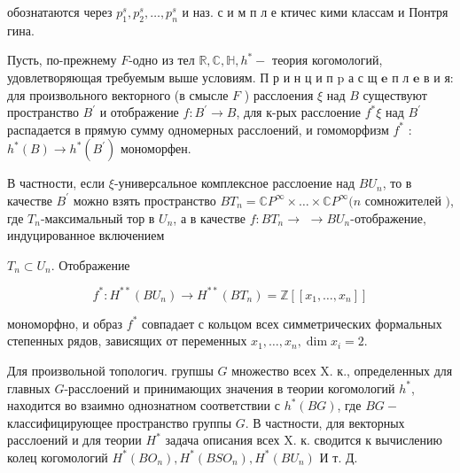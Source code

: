 \documentclass[10pt]{article}
\begin{document}
обознатаются через $p_{1}^{s}, p_{2}^{s}, \ldots, p_{n}^{s}$ и наз. с и м п л е ктичес кими классам и Понтря гина.



Пусть, по-прежнему $F$-одно из тел $\mathbb{R}, \mathbb{C}, \mathbb{H}, h^{*}-$ теория когомологий, удовлетворяющая требуемым выше условиям. П р и н ц и п $\mathrm{p}$ а с щ $\mathbf{e}$ п л $\mathbf{e}$ в и я: для произвольного векторного (в смысле $F$ ) расслоения $\xi$ над $B$ существуют пространство $B^{\prime}$ и отображение $f: B^{\prime} \longrightarrow B$, для к-рых расслоение $f^{*} \xi$ над $B^{\prime}$ распадается в прямую сумму одномерных расслоений, и гомоморфизм $f^{*}$ : $h^{*}(B) \longrightarrow h^{*}\left(B^{\prime}\right)$ мономорфен.



В частности, если $\xi$-универсальное комплексное расслоение над $B U_{n}$, то в качестве $B^{\prime}$ можно взять пространство $B T_{n}=\mathbb{C} P^{\infty} \times \ldots \times \mathbb{C} P^{\infty}(n$ сомножителей $)$, где $T_{n}$-максимальный тор в $U_{n}$, а в качестве $f: B T_{n} \longrightarrow$ $\longrightarrow B U_{n}$-отображение, индуцированное включением

$T_{n} \subset U_{n}$. Отображение



\[

f^{*}: H^{* *}\left(B U_{n}\right) \longrightarrow H^{* *}\left(B T_{n}\right)=\mathbb{Z}\left[\left[x_{1}, \ldots, x_{n}\right]\right]

\]



мономорфно, и образ $f^{*}$ совпадает с кольцом всех симметрических формальных степенных рядов, зависящих от переменных $x_{1}, \ldots, x_{n}, \operatorname{dim} x_{i}=2$.



Для произвольной топологич. групшы $G$ множество всех X. к., определенных для главных $G$-расслоений и принимающих значения в теории когомологий $h^{*}$, находится во взаимно однознатном соответствии с $h^{*}(B G)$, где $B G-$ классифицирующее пространство группы $G$. В частности, для векторных расслоений и для теории $H^{*}$ задача описания всех $\mathrm{X}$. к. сводится к вычислению колец когомологий $H^{*}\left(B O_{n}\right), H^{*}\left(B S O_{n}\right), H^{*}\left(B U_{n}\right)$ И т. Д.
\end{document}
